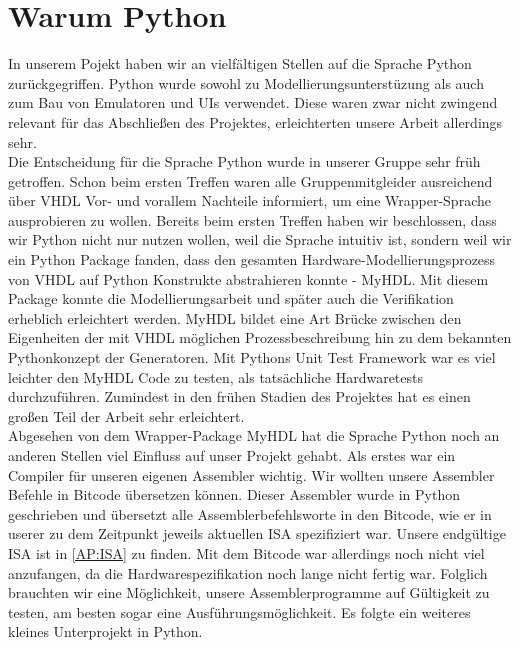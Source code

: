 \section{Warum Python} %
In unserem Pojekt haben wir an vielfältigen Stellen auf die Sprache Python zurückgegriffen. Python wurde sowohl zu Modellierungsunterstüzung als auch zum Bau von Emulatoren und UIs verwendet. Diese waren zwar nicht zwingend relevant für das Abschließen des Projektes, erleichterten unsere Arbeit allerdings sehr.\\
Die Entscheidung für die Sprache Python wurde in unserer Gruppe sehr früh getroffen. Schon beim ersten Treffen waren alle Gruppenmitgleider ausreichend über VHDL Vor- und vorallem Nachteile informiert, um eine Wrapper-Sprache ausprobieren zu wollen. Bereits beim ersten Treffen haben wir beschlossen, dass wir Python nicht nur nutzen wollen, weil die Sprache intuitiv ist, sondern weil wir ein Python Package fanden, dass den gesamten Hardware-Modellierungsprozess von VHDL auf Python Konstrukte abstrahieren konnte - MyHDL. Mit diesem Package konnte die Modellierungsarbeit und später auch die Verifikation erheblich erleichtert werden. MyHDL bildet eine Art Brücke zwischen den Eigenheiten der mit VHDL möglichen Prozessbeschreibung hin zu dem bekannten Pythonkonzept der Generatoren. Mit Pythons Unit Test Framework war es viel leichter den MyHDL Code zu testen, als tatsächliche Hardwaretests durchzuführen. Zumindest in den frühen Stadien des Projektes hat es einen großen Teil der Arbeit sehr erleichtert.\\
Abgesehen von dem Wrapper-Package MyHDL hat die Sprache Python noch an anderen Stellen viel Einfluss auf unser Projekt gehabt. Als erstes war ein Compiler für unseren eigenen Assembler wichtig. Wir wollten unsere Assembler Befehle in Bitcode übersetzen können. Dieser Assembler wurde in Python geschrieben und übersetzt alle Assemblerbefehlsworte in den Bitcode, wie er in userer zu dem Zeitpunkt jeweils aktuellen ISA spezifiziert war. Unsere endgültige ISA ist in \autoref{AP:ISA} zu finden. Mit dem Bitcode war allerdings noch nicht viel anzufangen, da die Hardwarespezifikation noch lange nicht fertig war. Folglich brauchten wir eine Möglichkeit, unsere Assemblerprogramme auf Gültigkeit zu testen, am besten sogar eine Ausführungsmöglichkeit. Es folgte ein weiteres kleines Unterprojekt in Python.\\
